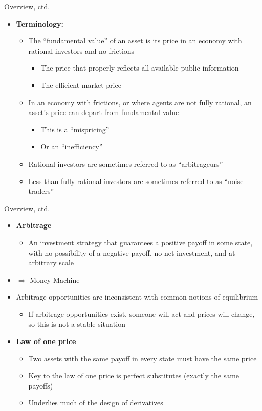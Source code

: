 \documentclass[aspectratio=169, 11pt]{beamer}
\begin{document}
\begin{frame}{Overview, ctd.}
\begin{itemize}
\item \textbf{Terminology:}
  \begin{itemize}
  \item The ``fundamental value'' of an asset is its price in an economy with rational investors and no frictions
    \begin{itemize}
    \item The price that properly reflects all available public information
    \item The efficient market price
    \end{itemize}
  \item In an economy with frictions, or where agents are not fully rational, an asset's price can depart from fundamental value
    \begin{itemize}
    \item This is a ``mispricing''
    \item Or an ``inefficiency''
    \end{itemize}
  \item Rational investors are sometimes referred to as ``arbitrageurs''
  \item Less than fully rational investors are sometimes referred to as ``noise traders''
  \end{itemize}
\end{itemize}
\end{frame}

\begin{frame}{Overview, ctd.}
\begin{itemize}
\item \textbf{Arbitrage}
  \begin{itemize}
  \item An investment strategy that guarantees a positive payoff in some state, with no possibility of a negative payoff, no net investment, and at arbitrary scale
  \end{itemize}
\item $\Rightarrow$ Money Machine
\item Arbitrage opportunities are inconsistent with common notions of equilibrium
  \begin{itemize}
  \item If arbitrage opportunities exist, someone will act and prices will change, so this is not a stable situation
  \end{itemize}
\item \textbf{Law of one price}
  \begin{itemize}
  \item Two assets with the same payoff in every state must have the same price
  \item Key to the law of one price is perfect substitutes (exactly the same payoffs)
  \item Underlies much of the design of derivatives
  \end{itemize}
\end{itemize}
\end{frame}
\end{document}
